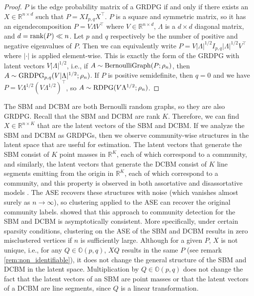 \documentclass[
  12pt,
]{article}
\theoremstyle{definition}
\theoremstyle{definition}
\theoremstyle{definition}
\theoremstyle{definition}
\theoremstyle{remark}
\begin{document}
\begin{proof}
$P$ is the edge probability matrix of a GRDPG if and only if there exists an $X \in \mathbb{R}^{n \times d}$ such that $P = X I_{p,q} X^\top$. 
$P$ is a square and symmetric matrix, so it has an eigendecomposition $P = V \Lambda V^\top$ where $V \in \mathbb{R}^{n \times d}$, $\Lambda$ is a $d \times d$ diagonal matrix, and $d = \mathrm{rank}(P) \ll n$. 
Let $p$ and $q$ respectively be the number of positive and negative eigenvalues of $P$. 
Then we can equivalently write $P = V |\Lambda|^{1/2} I_{p,q} |\Lambda|^{1/2} V^\top$ where $|\cdot|$ is applied element-wise. 
This is exactly the form of the GRDPG with latent vectors $V |\Lambda|^{1/2}$,
i.e., if $A \sim \mathrm{BernoulliGraph}(P; \rho_n)$, then $A \sim \mathrm{GRDPG}_{p,q}(V |\Lambda|^{1/2}; \rho_n)$. 
If $P$ is positive semidefinite, then $q = 0$ and we have $P = V \Lambda^{1/2} (V \Lambda^{1/2})^\top$, so $A \sim \mathrm{RDPG}(V \Lambda^{1/2}; \rho_n)$. 
\end{proof}

The SBM and DCBM are both Bernoulli random graphs, so they are also GRDPG.
Recall that the SBM and DCBM are rank \(K\).
Therefore, we can find \(X \in \mathbb{R}^{n \times K}\) that are the latent vectors of the SBM and DCBM.
If we analyze the SBM and DCBM as GRDPGs, then we observe community-wise structures in the latent space that are useful for estimation.
The latent vectors that generate the SBM consist of \(K\) point masses in \(\mathbb{R}^K\), each of which correspond to a community, and similarly, the latent vectors that generate the DCBM consist of \(K\) line segments emitting from the origin in \(\mathbb{R}^K\), each of which correspond to a community, and this property is observed in both assortative and disassortative models \citep{rubindelanchy2017statistical}.
The ASE recovers these structures with noise (which vanishes almost surely as \(n \to \infty\)), so clustering applied to the ASE can recover the original community labels.
\citet{rubindelanchy2017statistical} showed that this approach to community detection for the SBM and DCBM is asymptotically consistent.
More specifically, under certain sparsity conditions, clustering on the ASE of the SBM and DCBM results in zero misclustered vertices if \(n\) is sufficiently large.
Although for a given \(P\), \(X\) is not unique, i.e., for any \(Q \in \mathbb{O}(p, q)\), \(X Q\) results in the same \(P\) (see remark \ref{rem:non_identifiable}), it does not change the general structure of the SBM and DCBM in the latent space.
Multiplication by \(Q \in \mathbb{O}(p,q)\) does not change the fact that the latent vectors of an SBM are point masses or that the latent vectors of a DCBM are line segments, since \(Q\) is a linear transformation.
\end{document}
